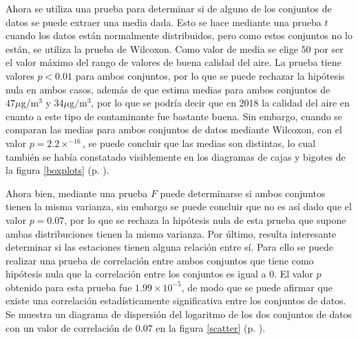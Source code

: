 \documentclass[paper=leter, fontsize=11pt]{scrartcl}
\numberwithin{equation}{section}		%
\numberwithin{figure}{section}			%
\numberwithin{table}{section}				%
\begin{document}
Ahora se utiliza una prueba para determinar si de alguno de los conjuntos de datos se puede extraer una media dada. Esto se hace mediante una prueba $t$ cuando los datos están normalmente distribuidos, pero como estos conjuntos no lo están, se utiliza la prueba de Wilcoxon. Como valor de media se elige $50$ por ser el valor máximo del rango de valores de buena calidad del aire. La prueba tiene valores $p < 0.01$ para ambos conjuntos, por lo que se puede rechazar la hipótesis nula en ambos casos, además de que estima medias para ambos conjuntos de $47 \mu\text{g}/\text{m}^3$ y $34 \mu\text{g}/\text{m}^3$, por lo que se podría decir que en 2018 la calidad del aire en cuanto a este tipo de contaminante fue bastante buena. Sin embargo, cuando se comparan las medias para ambos conjuntos de datos mediante Wilcoxon, con el valor $p = 2.2 \times ^{-16}$, se puede concluir que las medias son distintas, lo cual también se había constatado visiblemente en los diagramas de cajas y bigotes de la figura \ref{boxplots} (p. \pageref{boxplots}).

Ahora bien, mediante una prueba $F$ puede determinarse si ambos conjuntos tienen la misma varianza, sin embargo se puede concluir que no es así dado que el valor $p = 0.07$, por lo que se rechaza la hipótesis nula de esta prueba que supone ambas distribuciones tienen la misma varianza. Por último, resulta interesante determinar si las estaciones tienen alguna relación entre sí. Para ello se puede realizar una prueba de correlación entre ambos conjuntos que tiene como hipótesis nula que la correlación entre los conjuntos es igual a $0$. El valor $p$ obtenido para esta prueba fue $1.99 \times 10 ^{-5}$, de modo que se puede afirmar que existe una correlación estadísticamente significativa entre los conjuntos de datos. Se muestra un diagrama de dispersión del logaritmo de los dos conjuntos de datos con un valor de correlación de $0.07$ en la figura \ref{scatter} (p. \pageref{scatter}).
\end{document}
